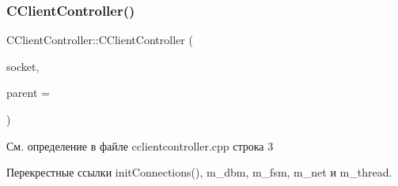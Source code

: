 \subsubsection{\texorpdfstring{C\+Client\+Controller()}{CClientController()}}
{\footnotesize\ttfamily C\+Client\+Controller\+::\+C\+Client\+Controller (\begin{DoxyParamCaption}\item[{Q\+Tcp\+Socket $\ast$}]{socket,  }\item[{Q\+Object $\ast$}]{parent = {} }\end{DoxyParamCaption})\hspace{0.3cm}{\ttfamily [explicit]}}



См. определение в файле cclientcontroller.\+cpp строка 3



Перекрестные ссылки init\+Connections(), m\+\_\+dbm, m\+\_\+fsm, m\+\_\+net и m\+\_\+thread.


